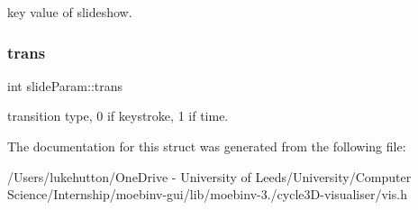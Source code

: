 key value of slideshow. \mbox{\label{structslide_param_a573b67ecfcd670121b0fa2f7317ab2d6}} 
\subsubsection{\texorpdfstring{trans}{trans}}
{\footnotesize\ttfamily int slide\+Param\+::trans}

transition type, 0 if keystroke, 1 if time. 

The documentation for this struct was generated from the following file\+:\begin{DoxyCompactItemize}
\item 
/\+Users/lukehutton/\+One\+Drive -\/ University of Leeds/\+University/\+Computer Science/\+Internship/moebinv-\/gui/lib/moebinv-\/3./cycle3\+D-\/visualiser/vis.\+h\end{DoxyCompactItemize}
